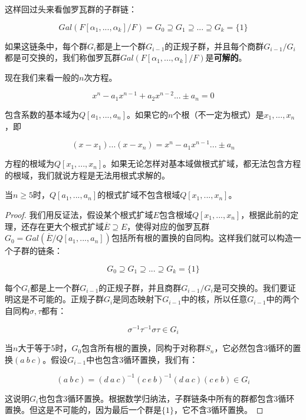 \documentclass[b5paper]{ctexart}
\begin{document}
这样回过头来看伽罗瓦群的子群链：

\[
Gal(F[\alpha_1, ..., \alpha_k]/F) = G_0 \supseteq G_1 \supseteq ... \supseteq G_k = \{1\}
\]

如果这链条中，每个群$G_i$都是上一个群$G_{i-1}$的正规子群，并且每个商群$G_{i-1}/G_i$都是可交换的，我们称伽罗瓦群$Gal(F[\alpha_1, ..., \alpha_k]/F)$是\textbf{可解的}。

现在我们来看一般的$n$次方程。

\[
x^n - a_1x^{n-1} + a_2x^{n-2}... \pm a_n = 0
\]

包含系数的基本域为$Q[a_1, ..., a_n]$。如果它的$n$个根（不一定为根式）是$x_1, ..., x_n$，即

\[
(x - x_1)...(x - x_n) = x^n - a_1x^{n-1} ... \pm a_n
\]

方程的根域为$Q[x_1, ..., x_n]$。如果无论怎样对基本域做根式扩域，都无法包含方程的根域，我们就说方程是无法用根式求解的。

\begin{theorem}
当$n \geq 5$时，$Q[a_1, ..., a_n]$的根式扩域不包含根域$Q[x_1, ..., x_n]$。
\end{theorem}

\begin{proof}
我们用反证法，假设某个根式扩域$E$包含根域$Q[x_1, ..., x_n]$，根据此前的定理，还存在更大个根式扩域$\overline{E} \supseteq E$，使得对应的伽罗瓦群$G_0 = Gal(\overline{E}/Q[a_1, ..., a_n])$包括所有根的置换的自同构。这样我们就可以构造一个子群的链条：

\[
G_0 \supseteq G_1 \supseteq ... \supseteq G_k = \{1\}
\]

每个$G_i$都是上一个群$G_{i-1}$的正规子群，并且商群$G_{i-1}/G_i$是可交换的。我们要证明这是不可能的。正规子群$G_i$是同态映射下$G_{i-1}$中的核，所以任意$G_{i-1}$中的两个自同构$\sigma, \tau$都有：

\[
\sigma^{-1}\tau^{-1}\sigma\tau \in G_{i}
\]

当$n$大于等于5时，$G_0$包含所有根的置换，同构于对称群$S_n$，它必然包含3循环的置换$(a\ b\ c)$。假设$G_{i-1}$中也包含3循环置换，我们有：

\[
(a\ b\ c) = (d\ a\ c)^{-1}(c\ e\ b)^{-1}(d\ a\ c)(c\ e\ b) \in G_i
\]

这说明$G_i$也包含3循环置换。根据数学归纳法，子群链条中所有的群都包含3循环置换。但这是不可能的，因为最后一个群是$\{1\}$，它不含3循环置换。
\end{proof}
\end{document}

